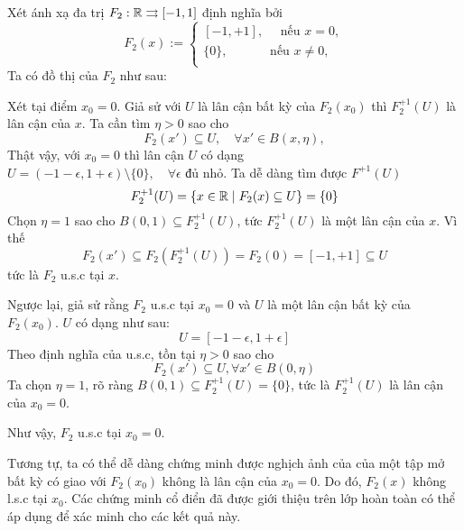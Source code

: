 \documentclass{article}
\begin{document}
\begin{example}
    Xét ánh xạ đa trị $F_2: \mathbb{R} \rightrightarrows [-1, 1]$ định nghĩa bởi
    \begin{equation}
        F_2(x) := \begin{cases}
            [-1, +1],\quad\text{ nếu } x = 0,\\
            \{0\},\quad\quad\quad\text{ nếu } x \ne 0,\\
        \end{cases}
    \end{equation}
    Ta có đồ thị của $F_2$ như sau:
    \begin{figure}[H]
        \centering
        
        \label{fig:f2}
    \end{figure}
    Xét tại điểm $x_0 = 0$. Giả sử với $U$ là lân cận bất kỳ của $F_2(x_0)$ thì $F_2^{+1}(U)$ là lân cận của $x$. Ta cần tìm $\eta > 0$ sao cho
    \begin{equation}
        F_2(x') \subseteq U, \quad\forall x' \in B(x, \eta),
    \end{equation}
    Thật vậy, với $x_0 = 0$ thì lân cận $U$ có dạng $U = (-1- \epsilon, 1 + \epsilon) \setminus \{0\},\quad\forall \epsilon \text{ đủ nhỏ}$. Ta dễ dàng tìm được $F^{+1}(U)$
    \begin{equation}
        F_2^{+1}(U) = \{x \in \mathbb{R} \mid F_2(x) \subseteq U\} = \{0\}
    \end{equation}
    Chọn $\eta = 1$ sao cho $B(0, 1) \subseteq F_2^{+1}(U)$, tức $F_2^{+1}(U)$ là một lân cận của $x$. Vì thế 
    \begin{equation}
        F_2(x') \subseteq F_2(F_2^{+1}(U)) = F_2(0) = [-1, +1] \subseteq U
    \end{equation}
    tức là $F_2$ u.s.c tại $x$.

    Ngược lại, giả sử rằng $F_2$ u.s.c tại $x_0 = 0$ và $U$ là một lân cận bất kỳ của $F_2(x_0)$. $U$ có dạng như sau:
    \begin{equation}
        U = [-1-\epsilon, 1 + \epsilon]
    \end{equation}
    Theo định nghĩa của u.s.c, tồn tại $\eta > 0$ sao cho
    \begin{equation}
        F_2(x') \subseteq U, \forall x' \in B(0, \eta)
    \end{equation}
    Ta chọn $\eta = 1$, rõ ràng $B(0, 1) \subseteq F_2^{+1}(U) = \{0\}$, tức là $F_2^{+1}(U)$ là lân cận của $x_0 = 0$.

    Như vậy, $F_2$ u.s.c tại $x_0 = 0.$


    Tương tự, ta có thể dễ dàng chứng minh được nghịch ảnh của của một tập mở bất kỳ có giao với $F_2(x_0)$ không là lân cận của $x_0 = 0$. Do đó, $F_2(x)$ không l.s.c tại $x_0$. Các chứng minh cổ điển đã được giới thiệu trên lớp hoàn toàn có thể áp dụng để xác minh cho các kết quả này. 
\end{example}
\end{document}
